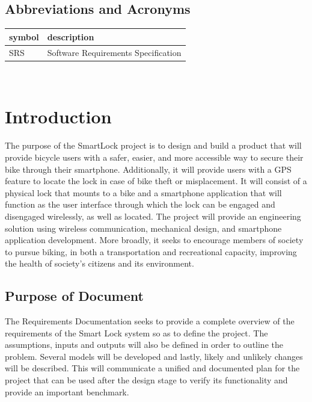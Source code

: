 \documentclass[12pt]{article}
\begin{document}
\subsection{Abbreviations and Acronyms}

\renewcommand{\arraystretch}{1.2}
\begin{tabular}{l l} 
  \toprule		
  \textbf{symbol} & \textbf{description}\\
  \midrule 
  SRS & Software Requirements Specification\\
  \bottomrule
\end{tabular}\\





\section{Introduction}

The purpose of the SmartLock project is to design and build a product that will provide bicycle users with a safer, easier, and more accessible way to secure their bike through their smartphone. Additionally, it will provide users with a GPS feature to locate the lock in case of bike theft or misplacement.  It will consist of a physical lock that mounts to a bike and a smartphone application that will function as the user interface through which the lock can be engaged and disengaged wirelessly, as well as located. The project will provide an engineering solution using wireless communication, mechanical design, and smartphone application development. More broadly, it seeks to encourage members of society to pursue biking, in both a transportation and recreational capacity, improving the health of society’s citizens and its environment.  

\subsection{Purpose of Document}

The Requirements Documentation seeks to provide a complete overview of the requirements of the Smart Lock system so as to define the project. The assumptions, inputs and outputs will also be defined in order to outline the problem. Several models will be developed and lastly, likely and unlikely changes will be described. This will communicate a unified and documented plan for the project that can be used after the design stage to verify its functionality and provide an important benchmark. 
\end{document}
